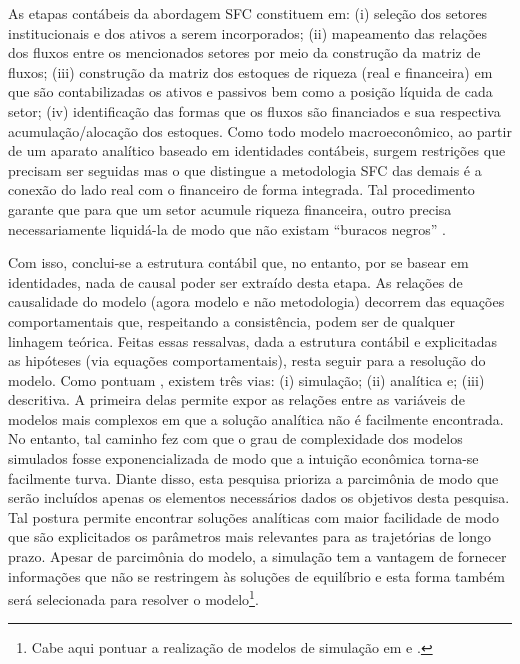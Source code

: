 


As etapas contábeis da abordagem SFC constituem em: (i) seleção dos setores institucionais e dos ativos a serem incorporados; (ii) mapeamento das relações dos fluxos entre os mencionados setores por meio da construção da matriz de fluxos; (iii) construção da matriz dos estoques de riqueza (real e financeira) em que são contabilizadas os ativos e passivos  bem como a posição líquida de cada setor; (iv) identificação das formas que os fluxos são financiados e sua respectiva acumulação/alocação dos estoques. 
Como todo modelo macroeconômico, ao partir de um aparato analítico
baseado em identidades contábeis, surgem restrições que precisam ser seguidas mas o que distingue
a metodologia SFC das demais é a conexão do lado real com o financeiro de forma integrada.
Tal procedimento garante que para que um setor acumule riqueza financeira, outro precisa necessariamente liquidá-la de modo que não existam ``buracos negros'' \cite{godley_money_1996}.

Com isso, conclui-se a estrutura contábil que, no entanto, por se basear em identidades, nada de causal poder ser extraído desta etapa. As relações de causalidade do modelo (agora modelo e não metodologia) decorrem das equações comportamentais que, respeitando a consistência, podem ser de qualquer linhagem teórica. Feitas essas ressalvas, dada a estrutura contábil e explicitadas as hipóteses (via equações comportamentais), resta seguir para a resolução do modelo. Como pontuam \textcite{caverzasi_stock-flow_2013}, existem três vias: (i) simulação; (ii) analítica e; (iii) descritiva. A primeira delas permite expor as relações entre as variáveis de modelos mais complexos em que a solução analítica não é facilmente encontrada. No entanto, tal caminho fez com que o grau de complexidade dos modelos simulados fosse exponencializada de modo que a intuição econômica torna-se facilmente turva.  
Diante disso, esta pesquisa prioriza a parcimônia de modo que serão incluídos apenas os elementos necessários dados os objetivos desta pesquisa.
Tal postura permite encontrar soluções analíticas com maior facilidade de modo que são explicitados os parâmetros mais relevantes para as
trajetórias de longo prazo. 
Apesar de parcimônia do modelo, a simulação tem a vantagem de fornecer informações que não se restringem às soluções de equilíbrio e esta forma também será selecionada para resolver o modelo\footnote{Cabe aqui pontuar a realização de modelos de simulação em \textcite{da_silveira_investimento_2019} e \textcite{petrini_demanda_2019}.}. 
